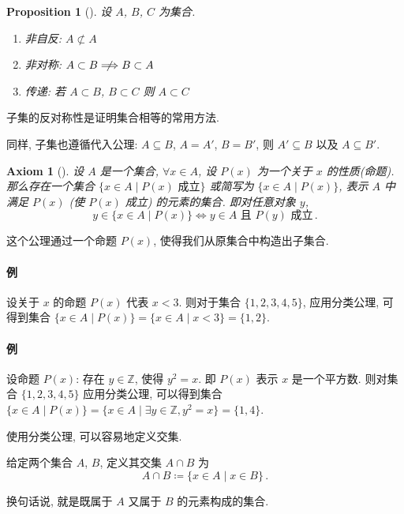\documentclass[UTF8]{ctexart}
\theoremstyle{mystyle}
\newtheorem{axiom}{Axiom}[section]
\newtheorem{proposition}{Proposition}[section]
\theoremstyle{myremark}
\theoremstyle{plain}
\newcommand{\Z}{\mathbb Z}
\newcommand{\set}[1]{\{#1\}}
\begin{document}
\begin{proposition}[]
    设 $ A $, $ B $, $ C $ 为集合. 
    \begin{enumerate}
        \item 非自反: $ A \not\subset A $
        \item 非对称: $ A \subset B \centernot \Longrightarrow B \subset A $ 
        \item 传递: 若 $ A \subset B $, $ B \subset C $ 则 $ A \subset C $
    \end{enumerate}
\end{proposition}

子集的反对称性是证明集合相等的常用方法.

同样, 子集也遵循代入公理: $ A \subseteq B $, $ A = A' $, $ B = B' $, 则 $ A' \subseteq B $ 以及 $ A \subseteq B' $.

\begin{axiom}[]
    设 $ A $ 是一个集合, $ \forall x \in A $, 设 $ P(x) $ 为一个关于 $ x $ 的性质(命题). 那么存在一个集合 $ \{ x \in A \mid P(x) \text{ 成立} \} $ 或简写为 $ \{ x \in A \mid P(x) \} $, 表示 $ A $ 中满足 $ P(x) $ (使 $ P(x) $ 成立) 的元素的集合. 即对任意对象 $ y $, \[ y \in \{x \in A \mid P(x)\} \Longleftrightarrow y \in A \text{ 且 } P(y) \text{ 成立} \,.\]
\end{axiom}

这个公理通过一个命题 $ P(x) $, 使得我们从原集合中构造出子集合. 

\paragraph{例} 设关于 $ x $ 的命题 $ P(x) $ 代表 $ x < 3 $. 则对于集合 $ \set{1, 2, 3, 4, 5} $, 应用分类公理, 可得到集合 $ \set{x \in A \mid P(x)} = \set{x \in A \mid x < 3} = \set{1, 2} $.

\paragraph{例} 设命题 $ P(x) $: 存在 $ y \in \Z $, 使得 $ y^2 = x $. 即 $ P(x) $ 表示 $ x $ 是一个平方数. 则对集合 $ \set{1, 2, 3, 4, 5} $ 应用分类公理, 可以得到集合 $ \set{x \in A \mid P(x)} = \set{x \in A \mid \exists y \in \Z, y^2 = x} = \set{1, 4} $.

使用分类公理, 可以容易地定义交集.

\begin{definition}[\text{交}]
    给定两个集合 $ A $, $ B $, 定义其交集 $ A \cap B $ 为
    \[ A \cap B \coloneqq \{x \in A \mid x \in B\} \,.\]

    换句话说, 就是既属于 $ A $ 又属于 $ B $ 的元素构成的集合.
\end{definition}
\end{document}
